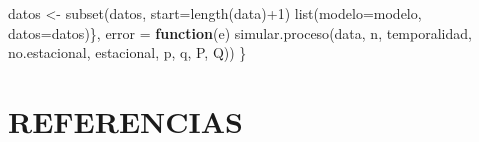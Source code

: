 \documentclass[
]{article}
\newenvironment{Shaded}{\begin{snugshade}}{\end{snugshade}}
\newcommand{\AttributeTok}[1]{\textcolor[rgb]{0.77,0.63,0.00}{#1}}
\newcommand{\ControlFlowTok}[1]{\textcolor[rgb]{0.13,0.29,0.53}{\textbf{#1}}}
\newcommand{\DecValTok}[1]{\textcolor[rgb]{0.00,0.00,0.81}{#1}}
\newcommand{\FunctionTok}[1]{\textcolor[rgb]{0.00,0.00,0.00}{#1}}
\newcommand{\NormalTok}[1]{#1}
\newcommand{\OtherTok}[1]{\textcolor[rgb]{0.56,0.35,0.01}{#1}}
\newcommand{\SpecialCharTok}[1]{\textcolor[rgb]{0.00,0.00,0.00}{#1}}
\begin{document}
\begin{Shaded}
\begin{Highlighting}[]
\NormalTok{    datos }\OtherTok{\textless{}{-}} \FunctionTok{subset}\NormalTok{(datos, }\AttributeTok{start=}\FunctionTok{length}\NormalTok{(data)}\SpecialCharTok{+}\DecValTok{1}\NormalTok{)}
    \FunctionTok{list}\NormalTok{(}\AttributeTok{modelo=}\NormalTok{modelo, }\AttributeTok{datos=}\NormalTok{datos)\}, }
    \AttributeTok{error =} \ControlFlowTok{function}\NormalTok{(e) }\FunctionTok{simular.proceso}\NormalTok{(data, n, temporalidad,}
\NormalTok{                                        no.estacional, estacional, }
\NormalTok{                                        p, q, P, Q))}
\NormalTok{\}}
\end{Highlighting}
\end{Shaded}

\newpage

\section{REFERENCIAS}
\end{document}
